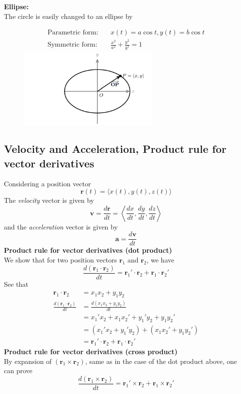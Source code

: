 \documentclass{report}
\begin{document}
\textbf{Ellipse:}\\
The circle is easily changed to an ellipse by
\begin{figure}[h]
\begin{align*}
\text{Parametric form:}&\quad x(t)=a\cos t,y(t)=b\cos t\\
\text{Symmetric form:}&\quad\frac{x^2}{a^2}+\frac{y^2}{b^2}=1
\end{align*}
\includegraphics[width=7cm]{Capture91}\\
\centering
\end{figure}
\newpage

\subsection{Velocity and Acceleration, Product rule for vector derivatives} %
Considering a position vector
\begin{equation*}
\bm{r}(t)=\langle x(t),y(t),z(t)\rangle
\end{equation*}
The \textit{velocity} vector is given by
\begin{equation*}
\bm{v}=\frac{d\bm{r}}{dt}=\left\langle
\frac{dx}{dt},\frac{dy}{dt},\frac{dz}{dt}\right\rangle
\end{equation*}
and the \textit{acceleration} vector is given by 
\begin{equation*}
\bm{a}=\frac{d\bm{v}}{dt}
\end{equation*}
\textbf{Product rule for vector derivatives (dot product)}\\
We show that for two position vectors $\bm{r}_1$ and $\bm{r}_2$, we have
\begin{equation*}
\frac{d(\bm{r}_1\cdot\bm{r}_2)}{dt}=
\bm{r}_1'\cdot\bm{r}_2+\bm{r}_1\cdot\bm{r}_2'
\end{equation*}
See that
\begin{align*}
\bm{r}_1\cdot\bm{r}_2&=x_1x_2+y_1y_2\\
\frac{d(\bm{r}_1\cdot\bm{r}_2)}{dt}&=
\frac{d(x_1x_2+y_1y_2)}{dt}\\
&=x_1'x_2+x_1x_2'+y_1'y_2+y_1y_2'\\
&=(x_1'x_2+y_1'y_2)+(x_1x_2'+y_1y_2')\\
&=\bm{r}_1'\cdot\bm{r}_2+\bm{r}_1\cdot\bm{r}_2'
\end{align*}
\textbf{Product rule for vector derivatives (cross product)}\\
By expansion of $(\bm{r}_1\times\bm{r}_2)$, same as in the case of the dot product above, one can prove
\begin{equation*}
\frac{d(\bm{r}_1\times\bm{r}_2)}{dt}=
\bm{r}_1'\times\bm{r}_2+\bm{r}_1\times\bm{r}_2'
\end{equation*}
\newpage
\end{document}
